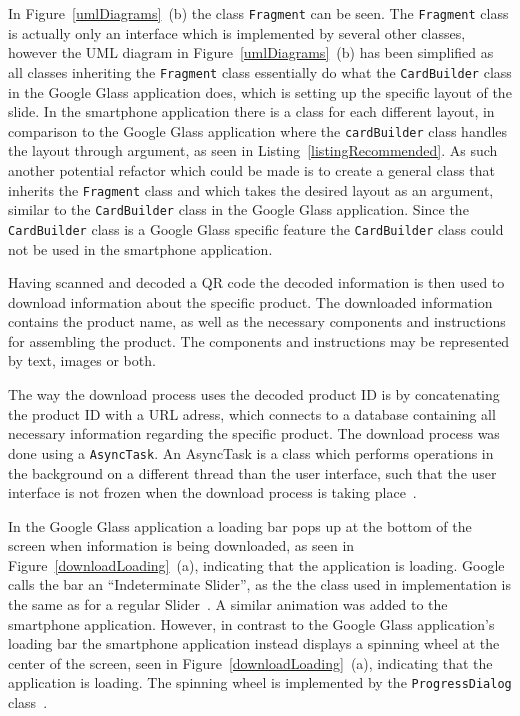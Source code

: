 In Figure~\ref{umlDiagrams}~(b) the class \texttt{Fragment} can be seen. The \texttt{Fragment} class is actually only an interface which is implemented by several other classes, however the UML diagram in Figure~\ref{umlDiagrams}~(b) has been simplified as all classes inheriting the \texttt{Fragment} class essentially do what the \texttt{CardBuilder} class in the Google Glass application does, which is setting up the specific layout of the slide. In the smartphone application there is a class for each different layout, in comparison to the Google Glass application where the \texttt{cardBuilder} class handles the layout through argument, as seen in Listing~\ref{listingRecommended}. As such another potential refactor which could be made is to create a general class that inherits the \texttt{Fragment} class and which takes the desired layout as an argument, similar to the \texttt{CardBuilder} class in the Google Glass application. Since the \texttt{CardBuilder} class is a Google Glass specific feature the \texttt{CardBuilder} class could not be used in the smartphone application.



Having scanned and decoded a QR code the decoded information is then used to download information about the specific product. The downloaded information contains the product name, as well as the necessary components and instructions for assembling the product. The components and instructions may be represented by text, images or both. 

The way the download process uses the decoded product ID is by concatenating the product ID with a URL adress, which connects to a database containing all necessary information regarding the specific product. The download process was done using a \texttt{AsyncTask}. An AsyncTask is a class which performs operations in the background on a different thread than the user interface, such that the user interface is not frozen when the download process is taking place~\cite{asyncTask}.

In the Google Glass application a loading bar pops up at the bottom of the screen when information is being downloaded, as seen in Figure~\ref{downloadLoading}~(a), indicating that the application is loading. Google calls the bar an ``Indeterminate Slider'', as the the class used in implementation is the same as for a regular Slider~\cite{indeterminateSlide}. A similar animation was added to the smartphone application. However, in contrast to the Google Glass application's loading bar the smartphone application instead displays a spinning wheel at the center of the screen, seen in Figure~\ref{downloadLoading}~(a), indicating that the application is loading. The spinning wheel is implemented by the \texttt{ProgressDialog} class~\cite{loadingWheel}.

